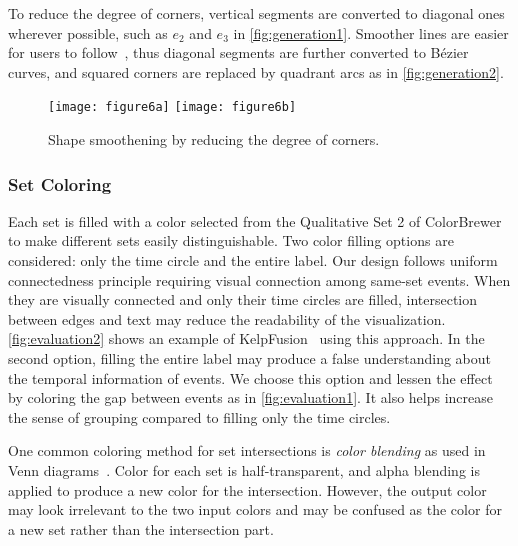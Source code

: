 To reduce the degree of corners, vertical segments are converted to diagonal ones wherever possible, such as  $e_2$ and $e_3$ in \autoref{fig:generation1}. Smoother lines are easier for users to follow~\cite{Kim2010}, thus diagonal segments are further converted to B\'{e}zier curves, and squared corners are replaced by quadrant arcs as in \autoref{fig:generation2}.

\begin{figure}
	\centering
		{\texttt{[image: figure6a]}}
	\hfill
		{\texttt{[image: figure6b]}}
	\caption{Shape smoothening by reducing the degree of corners.}
	\label{fig:generation}
\end{figure}

\subsubsection{Set Coloring}
\label{sub:ts-eventmembership}
Each set is filled with a color selected from the Qualitative Set 2 of ColorBrewer~\cite{Harrower2003} to make different sets easily distinguishable. Two color filling options are considered: only the time circle and the entire label. Our design follows uniform connectedness principle requiring visual connection among same-set events. When they are visually connected and only their time circles are filled, intersection between edges and text may reduce the readability of the visualization. \autoref{fig:evaluation2} shows an example of KelpFusion~\cite{Meulemans2013} using this approach. In the second option, filling the entire label may produce a false understanding about the temporal information of events. We choose this option and lessen the effect by coloring the gap between events as in \autoref{fig:evaluation1}. It also helps increase the sense of grouping compared to filling only the time circles.

One common coloring method for set intersections is \emph{color blending} as used in Venn diagrams~\cite{Ware2013}. Color for each set is half-transparent, and alpha blending is applied to produce a new color for the intersection. However, the output color may look irrelevant to the two input colors and may be confused as the color for a new set rather than the intersection part.

